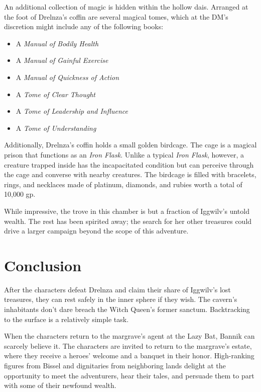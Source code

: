 \documentclass[10pt,a4paper,twoside,bg=print,twocolumn,openany,nodeprecatedcode]{dndbook}
\begin{document}
An additional collection of magic is hidden within the hollow dais. Arranged at the foot of Drelnza's coffin are several magical tomes, which at the DM's discretion might include any of the following books:


\begin{itemize}
\item A \textit{Manual of Bodily Health}
\item A \textit{Manual of Gainful Exercise}
\item A \textit{Manual of Quickness of Action}
\item A \textit{Tome of Clear Thought}
\item A \textit{Tome of Leadership and Influence}
\item A \textit{Tome of Understanding}
\end{itemize}

Additionally, Drelnza's coffin holds a small golden birdcage. The cage is a magical prison that functions as an \textit{Iron Flask}. Unlike a typical \textit{Iron Flask}, however, a creature trapped inside has the incapacitated condition but can perceive through the cage and converse with nearby creatures. The birdcage is filled with bracelets, rings, and necklaces made of platinum, diamonds, and rubies worth a total of 10,000 gp.

While impressive, the trove in this chamber is but a fraction of Iggwilv's untold wealth. The rest has been spirited away; the search for her other treasures could drive a larger campaign beyond the scope of this adventure.

\section{Conclusion}
After the characters defeat Drelnza and claim their share of Iggwilv's lost treasures, they can rest safely in the inner sphere if they wish. The cavern's inhabitants don't dare breach the Witch Queen's former sanctum. Backtracking to the surface is a relatively simple task.

When the characters return to the margrave's agent at the Lazy Bat, Bannik can scarcely believe it. The characters are invited to return to the margrave's estate, where they receive a heroes' welcome and a banquet in their honor. High-ranking figures from Bissel and dignitaries from neighboring lands delight at the opportunity to meet the adventurers, hear their tales, and persuade them to part with some of their newfound wealth.
\end{document}
